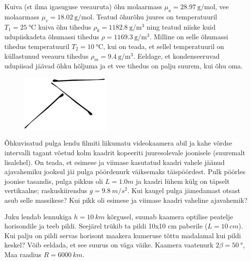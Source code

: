 \documentclass[10pt]{article}
\begin{document}
Kuiva (st ilma igasuguse veeauruta) õhu molaarmass $\mu_a=\SI{28.97}{\g\per\mole}$, vee molaarmass $\mu_v=\SI{18.02}{\g\per\mole}$. Teatud õhurõhu juures on temperatuuril $T_1=\SI{25}\celsius$ kuiva õhu tihedus $\rho_k=\SI{1182.8}{\g\per\m\cubed}$ ning teatud niiske kuid udupiiskadeta õhumassi tihedus $\rho=\SI{1169.3}{\g\per\m\cubed}$. Milline on selle õhumassi tihedus temperatuuril $T_2=\SI{10}\celsius$, kui on teada, et sellel temperatuuril on küllastunud veeauru tihedus $\rho_m=\SI{9.4}{\g\per\m\cubed}$. Eeldage, et kondenseeruvad udupiisad jäävad õhku hõljuma ja et vee tihedus on palju suurem, kui õhu oma.
\probend
\bigskip


\begin{figure}
	\vspace{-25pt}
	\begin{center}
		\includegraphics[width = 0.4\textwidth]{2018-lahg-10-yl.pdf}
	\end{center}
\end{figure}

Õhkuvisatud pulga lendu filmiti liikumatu videokaamera abil ja kahe võrdse intervalli tagant võetud kolm kaadrit kopeeriti juuresolevale joonisele (suuremalt lisalehel). On teada, et esimese ja viimase kasutatud kaadri vahele jäänud ajavahemiku jooksul jäi pulga pöördenurk väiksemaks täispöördest. Pulk pöörles joonise tasandis, pulga pikkus oli $L=\SI{1.0}m$ ja kaadri lühem külg on täpselt vertikaalne; raskuskiirendus $g=\SI{9.8}{m/s^2}$. Kui kaugel pulga jämedamast otsast asub selle massikese? Kui pikk oli esimese ja viimase kaadri vaheline ajavahemik?
\probend
\bigskip


Juku lendab lennukiga $h=\SI{10}{km}$ kõrgusel, suunab kaamera optilise peatelje horisondile ja teeb pildi. Seejärel trükib ta pildi 10x10 cm paberile ($L=\SI{10}{cm}$). Kui palju on pildi servas horisont maakera kumeruse tõttu madalamal kui pildi keskel? Võib eeldada, et see suurus on väga väike. Kaamera vaatenurk $2\beta=\SI{50}{\degree}$, Maa raadius $R=\SI{6000}{km}$.
\probend
\bigskip
\end{document}
